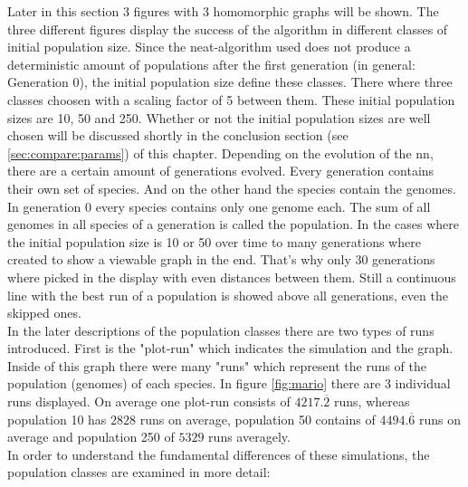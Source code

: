 		Later in this section 3 figures with 3 homomorphic graphs will be shown. The three different figures display the success of the algorithm in different classes of initial population size. Since the \gls{neat}-algorithm used does not produce a deterministic amount of populations after the first generation (in general: Generation 0), the initial population size define these classes. There where three classes choosen with a scaling factor of 5 between them. These initial population sizes are 10, 50 and 250. Whether or not the initial population sizes are well chosen will be discussed shortly in the conclusion section (see \ref{sec:compare:params}) of this chapter. Depending on the evolution of the \gls{nn}, there are a certain amount of generations evolved. Every generation contains their own set of species. And on the other hand the species contain the genomes. In generation 0 every species contains only one genome each. The sum of all genomes in all species of a generation is called the population. In the cases where the initial population size is 10 or 50 over time to many generations where created to show a viewable graph in the end. That's why only 30 generations where picked in the display with even distances between them. Still a continuous line with the best run of a population is showed above all generations, even the skipped ones. \\
		In the later descriptions of the population classes there are two types of runs introduced. First is the "plot-run" which indicates the simulation and the graph. Inside of this graph there were many "runs" which represent the runs of the population (genomes) of each species. In figure \ref{fig:mario} there are 3 individual runs displayed. On average one plot-run consists of $4217.\overline{2}$ runs, whereas population 10 has $2828$ runs on average, population 50 contains of $4494.\overline{6}$ runs on average and population 250 of $5329$ runs averagely.\\
		In order to understand the fundamental differences of these simulations, the population classes are examined in more detail: 
